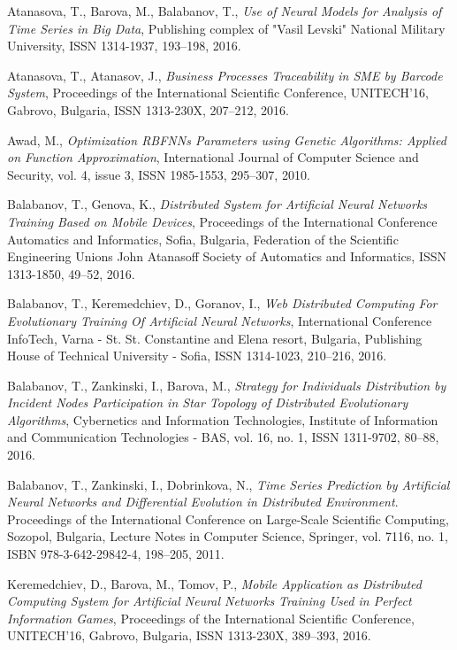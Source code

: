 \documentclass{llncs}
\begin{document}
\begin{thebibliography}{99}

 Atanasova, T., Barova, M., Balabanov, T., \textit{Use of Neural Models for Analysis of Time Series in Big Data}, Publishing complex of "Vasil Levski" National Military University, ISSN 1314-1937, 193--198, 2016.

 Atanasova, T., Atanasov, J., \textit{Business Processes Traceability in SME by Barcode System}, Proceedings of the International Scientific Conference, UNITECH’16, Gabrovo, Bulgaria, ISSN 1313-230X,  207--212, 2016.

 Awad, M., \textit{Optimization RBFNNs Parameters using Genetic Algorithms: Applied on Function Approximation}, International Journal of Computer Science and Security, vol. 4, issue 3, ISSN 1985-1553, 295--307, 2010.

 Balabanov, T., Genova, K., \textit{Distributed System for Artificial Neural Networks Training Based on Mobile Devices}, Proceedings of the International Conference Automatics and Informatics, Sofia, Bulgaria, Federation of the Scientific Engineering Unions John Atanasoff Society of Automatics and Informatics, ISSN 1313-1850, 49--52, 2016.

 Balabanov, T., Keremedchiev, D., Goranov, I., \textit{Web Distributed Computing For Evolutionary Training Of Artificial Neural Networks}, International Conference InfoTech, Varna - St. St. Constantine and Elena resort, Bulgaria, Publishing House of Technical University - Sofia, ISSN 1314-1023, 210--216, 2016.

 Balabanov, T., Zankinski, I., Barova, M., \textit{Strategy for Individuals Distribution by Incident Nodes Participation in Star Topology of Distributed Evolutionary Algorithms}, Cybernetics and Information Technologies, Institute of Information and Communication Technologies - BAS, vol. 16, no. 1, ISSN 1311-9702, 80--88, 2016.

 Balabanov, T., Zankinski, I., Dobrinkova, N., \textit{Time Series Prediction by Artificial Neural Networks and Differential Evolution in Distributed Environment}. Proceedings of the International Conference on Large-Scale Scientific Computing, Sozopol, Bulgaria, Lecture Notes in Computer Science, Springer, vol. 7116, no. 1, ISBN 978-3-642-29842-4, 198–205, 2011. 

 Keremedchiev, D., Barova, M., Tomov, P., \textit{Mobile Application as Distributed Computing System for Artificial Neural Networks Training Used in Perfect Information Games}, Proceedings of the International Scientific Conference, UNITECH’16, Gabrovo, Bulgaria, ISSN 1313-230X, 389--393, 2016.


\end{thebibliography}
\end{document}

